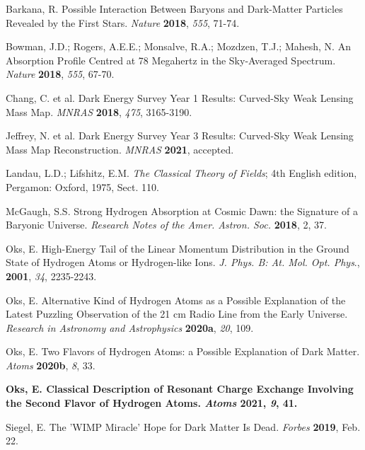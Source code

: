 \documentclass[referee]{raa}            %
\begin{document}
	\begin{thebibliography}{99}
		 Barkana, R. Possible Interaction Between Baryons and Dark-Matter Particles Revealed by the 
		First Stars. \textit{Nature} \textbf{2018}, \textit{555}, 71-74. 
		
		Bowman, J.D.; Rogers, A.E.E.; Monsalve, R.A.; Mozdzen, T.J.; Mahesh, N. An Absorption     
		Profile Centred at 78 Megahertz in the Sky-Averaged Spectrum. \textit{Nature} \textbf{2018}, \textit{555}, 67-70. 
		
		Chang, C. et al. Dark Energy Survey Year 1 Results: Curved-Sky Weak Lensing Mass Map. 
		\textit{MNRAS} \textbf{2018}, \textit{475}, 3165-3190.
		
		Jeffrey, N. et al. Dark Energy Survey Year 3 Results: Curved-Sky Weak Lensing Mass Map 
		Reconstruction.	\textit{MNRAS} \textbf{2021}, accepted.
		
		Landau, L.D.; Lifshitz, E.M. \textit{The Classical Theory of Fields}; 4th English edition, Pergamon: 
		Oxford, 1975, Sect. 110.
		
		McGaugh, S.S. Strong Hydrogen Absorption at Cosmic Dawn: the Signature of a Baryonic 
		Universe. \textit{Research Notes of the Amer. Astron. Soc.} \textbf{2018}, 2, 37.
		
		Oks, E. High-Energy Tail of the Linear Momentum Distribution in the Ground State of 
		Hydrogen Atoms or Hydrogen-like Ions. \textit{J. Phys. B: At. Mol. Opt. Phys}., \textbf{2001}, \textit{34}, 2235-2243.
		
		Oks, E. Alternative Kind of Hydrogen Atoms as a Possible Explanation of the Latest Puzzling 
		Observation of the 21 cm Radio Line from the Early Universe. \textit{Research in Astronomy and 
		Astrophysics} \textbf{2020a}, \textit{20}, 109.
	
	    Oks, E. Two Flavors of Hydrogen Atoms: a Possible Explanation of Dark Matter.  \textit{Atoms} \textbf{2020b}, \textit{8}, 33.
	    
	    \textbf{Oks, E. Classical Description of Resonant Charge Exchange Involving the Second Flavor of Hydrogen
	    Atoms. \textit{Atoms} \textbf{2021}, \textit{9}, 41.}
	    
	    Siegel, E. The 'WIMP Miracle' Hope for Dark Matter Is Dead. \textit{Forbes} \textbf{2019}, Feb. 22.	
	    
\end{thebibliography}
	
\label{lastpage}
	
\end{document}
